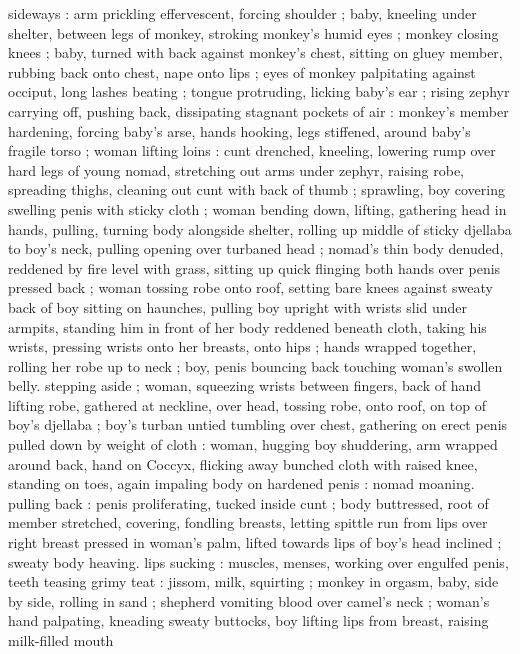 sideways : arm prickling effervescent, forcing shoulder ; baby, 
kneeling under shelter, between legs of monkey, stroking monkey's 
humid eyes ; monkey closing knees ; baby, turned with back against 
monkey's chest, sitting on gluey member, rubbing back onto chest, 
nape onto lips ; eyes of monkey palpitating against occiput, long 
lashes beating ; tongue protruding, licking baby's ear ; rising zephyr 
carrying off, pushing back, dissipating stagnant pockets of air : 
monkey's member hardening, forcing baby's arse, hands hooking, 
legs stiffened, around baby's fragile torso ; woman lifting loins : cunt 
drenched, kneeling, lowering rump over hard legs of young nomad, 
stretching out arms under zephyr, raising robe, spreading thighs, 
cleaning out cunt with back of thumb ; sprawling, boy covering 
swelling penis with sticky cloth ; woman bending down, lifting, 
gathering head in hands, pulling, turning body alongside shelter, 
rolling up middle of sticky djellaba to boy's neck, pulling opening 
over turbaned head ; nomad's thin body denuded, reddened by fire 
level with grass, sitting up quick flinging both hands over penis 
pressed back ; woman tossing robe onto roof, setting bare knees 
against sweaty back of boy sitting on haunches, pulling boy upright 
with wrists slid under armpits, standing him in front of her body 
reddened beneath cloth, taking his wrists, pressing wrists onto her 
breasts, onto hips ; hands wrapped together, rolling her robe up to 
neck ; boy, penis bouncing back touching woman's swollen belly. 
stepping aside ; woman, squeezing wrists between fingers, back of 
hand lifting robe, gathered at neckline, over head, tossing robe, onto 
roof, on top of boy's djellaba ; boy's turban untied tumbling over 
chest, gathering on erect penis pulled down by weight of cloth : 
woman, hugging boy shuddering, arm wrapped around back, hand on 
Coccyx, flicking away bunched cloth with raised knee, standing on 
toes, again impaling body on hardened penis : nomad moaning. 
pulling back : penis proliferating, tucked inside cunt ; body 
buttressed, root of member stretched, covering, fondling breasts, 
letting spittle run from lips over right breast pressed in woman's 
palm, lifted towards lips of boy's head inclined ; sweaty body 
heaving. lips sucking : muscles, menses, working over engulfed 
penis, teeth teasing grimy teat : jissom, milk, squirting ; monkey in 
orgasm, baby, side by side, rolling in sand ; shepherd vomiting blood 
over camel's neck ; woman's hand palpating, kneading sweaty 
buttocks, boy lifting lips from breast, raising milk-filled mouth 
